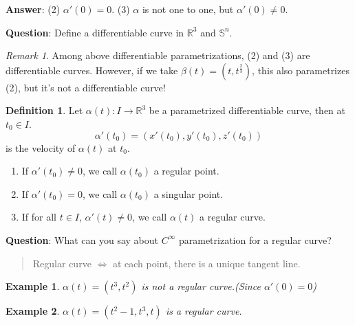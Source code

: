 \documentclass[UTF8,oneside,11pt]{book}
\theoremstyle{plain}\newtheorem{thm}{Theorem}
\theoremstyle{definition}\newtheorem{defn}[thm]{Definition}
\theoremstyle{plain}\newtheorem{axiom}[thm]{Axiom}
\theoremstyle{plain}\newtheorem{coro}[thm]{Corollary}
\theoremstyle{plain}\newtheorem{lemma}[thm]{Lemma}
\theoremstyle{plain}\newtheorem{prop}[thm]{Proposition}
\theoremstyle{plain}\newtheorem{conj}[thm]{Conjecture}
\theoremstyle{plain}\newtheorem{ques}[thm]{Problem}
\theoremstyle{plain}\newtheorem{const}[thm]{Construction}
\theoremstyle{remark}\newtheorem{notation}[thm]{Notation}
\theoremstyle{plain}\newtheorem*{app}{Application}
\theoremstyle{plain}\newtheorem*{exam}{Example}
\theoremstyle{plain}\newtheorem*{exer}{Exercise}
\theoremstyle{remark}\newtheorem*{remark}{Remark}
\theoremstyle{remark}\newtheorem*{note}{\small{Note}}
\numberwithin{equation}{section}
\numberwithin{thm}{section}
\begin{document}
\noindent
\textbf{Answer}:
    (2) $\alpha'(0)=0$.
    (3) $\alpha$ is not one to one, but $\alpha'(0)\neq 0$.

\noindent 
\textbf{Question}: Define a differentiable curve in $\mathbb{R}^3$ and $\mathbb{S}^n$.
\begin{remark}
    Among above differentiable parametrizations, (2) and (3) are differentiable curves. However, if we take $\beta(t)=(t,t^{\frac{2}{3}})$, this also parametrizes (2), but it's not a differentiable curve!
\end{remark}
\begin{defn}
    Let $\alpha(t)\colon I\to \mathbb{R}^3$ be a parametrized differentiable curve, then at $t_0\in I$.
    \[ \alpha'(t_0)=(x'(t_0),y'(t_0),z'(t_0))\]
    is the velocity of $\alpha(t)$ at $t_0$.
    \begin{enumerate}[(1)]
        \item If $\alpha'(t_0)\neq 0$, we call $\alpha(t_0)$ a regular point.
        \item If $\alpha'(t_0) = 0$, we call $\alpha(t_0)$ a singular point.
        \item If for all $t\in I$, $\alpha'(t)\neq 0$, we call $\alpha(t)$ a regular curve.
    \end{enumerate}
\end{defn}
\noindent
\textbf{Question}: What can you say about $C^\infty$ parametrization for a regular curve?
\begin{quotation}
Regular curve $\Longleftrightarrow $ at each point, there is a unique tangent line.
\end{quotation}
\begin{exam}
$\alpha(t)=(t^3,t^2)$ is not a regular curve.(Since $\alpha'(0)=0$)
\begin{center}
\end{center}
\end{exam}
\begin{exam}
$\alpha(t)=(t^2-1,t^3,t)$ is a regular curve.
\begin{center}
\end{center}
\end{exam}
\end{document}
